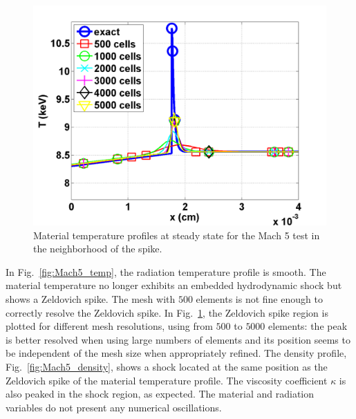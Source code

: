 \documentclass[review]{elsarticle}
\newcommand{\fig}[1]{Fig.~\ref{#1}}                      %
\begin{document}
\begin{figure}[H]
                \centering
                \includegraphics[width=\textwidth]{figs/Mach_5_comparison.png}
        \caption{Material temperature profiles at steady state for the Mach 5 test in the neighborhood of the spike.}\label{fig:Mach5_comparison}
\end{figure}
In \fig{fig:Mach5_temp}, the radiation temperature profile is smooth. The material temperature no longer exhibits an embedded hydrodynamic shock but shows a Zeldovich spike. The mesh with $500$ elements is not fine enough to correctly resolve the Zeldovich spike. In \fig{fig:Mach5_comparison}, the Zeldovich spike region is plotted for different mesh resolutions, using from $500$ to $5000$ elements: the peak is better resolved when using large numbers of elements and its position seems to be independent of the mesh size when appropriately refined. The density profile, \fig{fig:Mach5_density}, shows a shock located at the same position as the Zeldovich spike of the material temperature profile. The viscosity coefficient $\kappa$ is also peaked in the shock region, as expected. The material and radiation variables do not present any numerical oscillations. 
\end{document}
